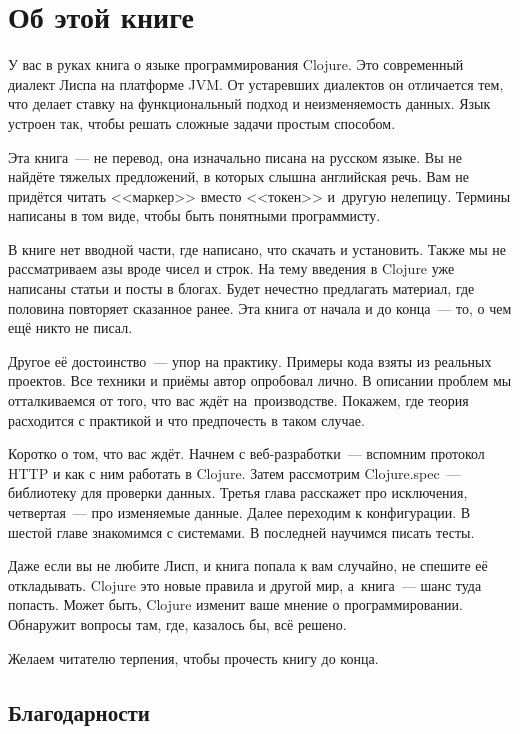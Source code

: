 \chapter*{Об этой книге}

У вас в руках книга о языке программирования Clojure. Это современный диалект
Лиспа на платформе JVM. От устаревших диалектов он отличается тем, что делает
ставку на функциональный подход и неизменяемость данных. Язык устроен так, чтобы
решать сложные задачи простым способом.

Эта книга~--- не перевод, она изначально писана на русском языке. Вы не найд\"{е}те
тяжелых предложений, в которых слышна английская речь. Вам не прид\"{е}тся читать
<<маркер>> вместо <<токен>> и~другую нелепицу. Термины написаны в том виде,
чтобы быть понятными программисту.

В книге нет вводной части, где написано, что скачать и установить. Также мы не
рассматриваем азы вроде чисел и строк. На тему введения в Clojure уже написаны
статьи и посты в блогах. Будет нечестно предлагать материал, где половина
повторяет сказанное ранее. Эта книга от начала и до конца~--- то, о чем ещ\"{е}
никто не писал.

Другое е\"{е} достоинство~--- упор на практику. Примеры кода взяты из реальных
проектов. Все техники и при\"{е}мы автор опробовал лично. В описании проблем мы
отталкиваемся от того, что вас ждёт на~производстве. Покажем, где теория
расходится с практикой и что предпочесть в таком случае.

Коротко о том, что вас ждёт. Начнем с веб-разработки~--- вспомним протокол HTTP
и как с ним работать в Clojure. Затем рассмотрим Clojure.spec~--- библиотеку для
проверки данных. Третья глава расскажет про исключения, четвертая~--- про
изменяемые данные. Далее переходим к конфигурации. В шестой главе знакомимся с
системами. В последней научимся писать тесты.

Даже если вы не любите Лисп, и книга попала к вам случайно, не спешите е\"{е}
откладывать. Clojure это новые правила и другой мир, а~книга~--- шанс туда
попасть. Может быть, Clojure изменит ваше мнение о программировании. Обнаружит
вопросы там, где, казалось бы, вс\"{е} решено.

Желаем читателю терпения, чтобы прочесть книгу до конца.

\section*{Благодарности}

